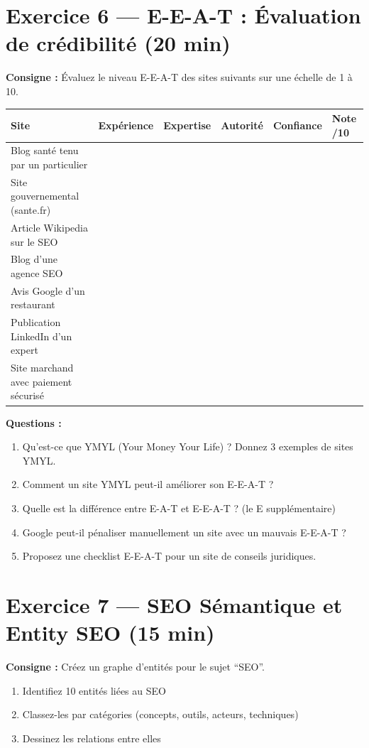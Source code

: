 \documentclass[12pt,a4paper]{report}
\begin{document}
\section{Exercice 6 --- E-E-A-T : \'{E}valuation de cr\'{e}dibilit\'{e} (20 min)}

\textbf{Consigne :} \'{E}valuez le niveau E-E-A-T des sites suivants sur une \'{e}chelle de 1 \`{a} 10.

\begin{longtable}{llllll}
\toprule
Site & Exp\'{e}rience & Expertise & Autorit\'{e} & Confiance & Note /10 \\
\midrule
\endhead
\bottomrule
\endfoot
Blog sant\'{e} tenu par un particulier & & & & & \\
Site gouvernemental (sante.fr) & & & & & \\
Article Wikipedia sur le SEO & & & & & \\
Blog d'une agence SEO & & & & & \\
Avis Google d'un restaurant & & & & & \\
Publication LinkedIn d'un expert & & & & & \\
Site marchand avec paiement s\'{e}curis\'{e} & & & & & \\
\bottomrule
\end{longtable}

\textbf{Questions :}
\begin{enumerate}
    \item Qu'est-ce que YMYL (Your Money Your Life) ? Donnez 3 exemples de sites YMYL.
    \item Comment un site YMYL peut-il am\'{e}liorer son E-E-A-T ?
    \item Quelle est la diff\'{e}rence entre E-A-T et E-E-A-T ? (le E suppl\'{e}mentaire)
    \item Google peut-il p\'{e}naliser manuellement un site avec un mauvais E-E-A-T ?
    \item Proposez une checklist E-E-A-T pour un site de conseils juridiques.
\end{enumerate}

\section{Exercice 7 --- SEO S\'{e}mantique et Entity SEO (15 min)}

\textbf{Consigne :} Cr\'{e}ez un graphe d'entit\'{e}s pour le sujet ``SEO''.

\begin{enumerate}
    \item Identifiez 10 entit\'{e}s li\'{e}es au SEO
    \item Classez-les par cat\'{e}gories (concepts, outils, acteurs, techniques)
    \item Dessinez les relations entre elles
\end{enumerate}
\end{document}
